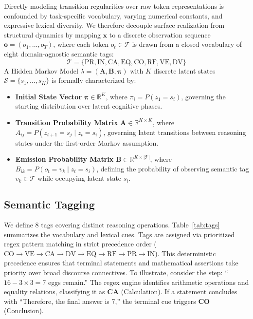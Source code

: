 \documentclass[conference]{IEEEtran}
\begin{document}
Directly modeling transition regularities over raw token representations is confounded by task-specific vocabulary, varying numerical constants, and expressive lexical diversity. We therefore decouple surface realization from structural dynamics by mapping $\mathbf{x}$ to a discrete observation sequence $\mathbf{o} = (o_1, \ldots, o_T)$, where each token $o_t \in \mathcal{T}$ is drawn from a closed vocabulary of eight domain-agnostic semantic tags:
\begin{equation}
\mathcal{T} = \{\text{PR}, \text{IN}, \text{CA}, \text{EQ}, \text{CO}, \text{RF}, \text{VE}, \text{DV}\}
\end{equation}
A Hidden Markov Model $\lambda = (\mathbf{A}, \mathbf{B}, \boldsymbol{\pi})$ with $K$ discrete latent states $\mathcal{S} = \{s_1, \ldots, s_K\}$ is formally characterized by:
\begin{itemize}
    \item \textbf{Initial State Vector} $\boldsymbol{\pi} \in \mathbb{R}^K$, where $\pi_i = P(z_1 = s_i)$, governing the starting distribution over latent cognitive phases.
    \item \textbf{Transition Probability Matrix} $\mathbf{A} \in \mathbb{R}^{K \times K}$, where $A_{ij} = P(z_{t+1} = s_j \mid z_t = s_i)$, governing latent transitions between reasoning states under the first-order Markov assumption.
    \item \textbf{Emission Probability Matrix} $\mathbf{B} \in \mathbb{R}^{K \times |\mathcal{T}|}$, where $B_{ik} = P(o_t = v_k \mid z_t = s_i)$, defining the probability of observing semantic tag $v_k \in \mathcal{T}$ while occupying latent state $s_i$.
\end{itemize}

\subsection{Semantic Tagging}

We define 8 tags covering distinct reasoning operations. Table~\ref{tab:tags} summarizes the vocabulary and lexical cues. Tags are assigned via prioritized regex pattern matching in strict precedence order ($\text{CO} \to \text{VE} \to \text{CA} \to \text{DV} \to \text{EQ} \to \text{RF} \to \text{PR} \to \text{IN}$). This deterministic precedence ensures that terminal statements and mathematical assertions take priority over broad discourse connectives. To illustrate, consider the step: ``$16 - 3 \times 3 = 7$ eggs remain.'' The regex engine identifies arithmetic operations and equality relations, classifying it as \textbf{CA} (Calculation). If a statement concludes with ``Therefore, the final answer is 7,'' the terminal cue triggers \textbf{CO} (Conclusion).
\end{document}
